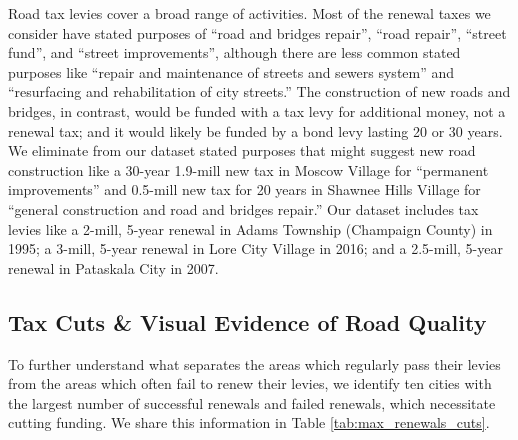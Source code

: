 Road tax levies cover a broad range of activities.  Most of the renewal taxes we consider have stated purposes of “road and bridges repair”, “road repair”, “street fund”, and “street improvements”, although there are less common stated purposes like “repair and maintenance of streets and sewers system” and “resurfacing and rehabilitation of city streets.”  The construction of new roads and bridges, in contrast, would be funded with a tax levy for additional money, not a renewal tax; and it would likely be funded by a bond levy lasting 20 or 30 years.  We eliminate from our dataset stated purposes that might suggest new road construction like a 30-year 1.9-mill new tax in Moscow Village for “permanent improvements” and 0.5-mill new tax for 20 years in Shawnee Hills Village for “general construction and road and bridges repair.” Our dataset includes tax levies like a 2-mill, 5-year renewal in Adams Township (Champaign County) in 1995; a 3-mill, 5-year renewal in Lore City Village in 2016; and a 2.5-mill, 5-year renewal in Pataskala City in 2007.


\subsection{Tax Cuts \& Visual Evidence of Road Quality}

To further understand what separates the areas which regularly pass their levies from the areas which often fail to renew their levies, we identify ten cities with the largest number of successful renewals and failed renewals, which necessitate cutting funding. We share this information in Table \ref{tab:max_renewals_cuts}. 



